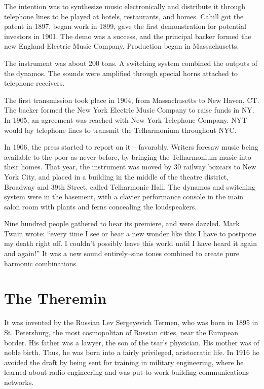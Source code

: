 The intention was to synthesize music electronically and distribute it through telephone lines to be played at hotels, restaurants, and homes. Cahill got the patent in 1897, began work in 1899, gave the first demonstration for potential investors in 1901. The demo was a success, and the principal backer formed the new England Electric Music Company. Production began in Massachusetts.

The instrument was about 200 tons. A switching system combined the outputs of the dynamos. The sounds were amplified through special horns attached to telephone receivers.

The first transmission took place in 1904, from Massachusetts to New Haven, CT. The backer formed the New York Electric Music Company to raise funds in NY. In 1905, an agreement was reached with New York Telephone Company. NYT would lay telephone lines to transmit the Telharmonium throughout NYC.

In 1906, the press started to report on it -- favorably. Writers foresaw music being available to the poor as never before, by bringing the Telharmonium music into their homes. That year, the instrument was moved by 30 railway boxcars to New York City, and placed in a building in the middle of the theatre district, Broadway and 39th Street, called Telharmonic Hall. The dynamos and switching system were in the basement, with a clavier performance console in the main salon room with plants and ferns concealing the loudspeakers.

Nine hundred people gathered to hear its premiere, and were dazzled. Mark Twain wrote: ``every time I see or hear a new wonder like this I have to postpone my death right off. I couldn't possibly leave this world until I have heard it again and again!'' It was a new sound entirely--sine tones combined to create pure harmonic combinations. 

\section{The Theremin}

It was invented by the Russian Lev Sergeyevich Termen, who was born in 1895 in St. Petersburg, the most cosmopolitan of Russian cities, near the European border. His father was a lawyer, the son of the tsar's physician. His mother was of noble birth. Thus, he was born into a fairly privileged, aristocratic life. In 1916 he avoided the draft by being sent for training in military engineering, where he learned about radio engineering and was put to work building communications networks.

